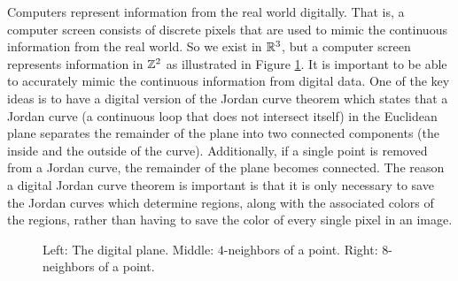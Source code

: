 \begin{comment}
	\item This statement is true. Since $C_1$ and $C_2$ are closed, we know that $C_1 = \overline{C_1}$ and $C_2 = \overline{C_2}$. By Exercise \ref{ex:product_closure} we know that 
	\[C_1 \times C_2 = \overline{C_1} \times \overline{C_2} = \overline{C_1 \times C_2}.\]
	So $C_1 \times C_2$ is closed in $X_1 \times X_2$. 
		
	\item This statement is true. Since $C_1 \times C_2$ is closed, we know that $C_1 \times C_2 = \overline{C_1 \times C_2}$. By Exercise \ref{ex:product_closure} we know that 
	\[C_1 \times C_2 = \overline{C_1 \times C_2} = \overline{C_1} \times \overline{C_2}.\]
	So $C_1 = \overline{C_1}$ and $C_2 = \overline{C_2}$ and $C_1$ and $C_2$ are closed. 
			
	\ea

\end{comment}

\ee



Computers represent information from the real world digitally. That is, a computer screen consists of discrete pixels that are used to mimic the continuous information from the real world. So we exist in $\mathbb{R}^3$, but a computer screen represents information in $\mathbb{Z}^2$ as illustrated in Figure \ref{F:Digital_plane}. It is important to be able to accurately mimic the continuous information from digital data. One of the key ideas is to have a digital version of the Jordan curve theorem which states that a Jordan curve (a continuous loop that does not intersect itself) in the Euclidean plane separates the remainder of the  plane into two connected components (the inside and the outside of the curve). Additionally, if a single point is removed from a Jordan curve, the remainder of the plane becomes connected. The reason a digital Jordan curve theorem is important is that it is only necessary to save the Jordan curves which determine regions, along with the associated colors of the regions, rather than having to save the color of every single pixel in an image. 

\begin{figure}[t]
\begin{center}
 \hspace{0.25in}  \hspace{0.25in} 
\caption{Left: The digital plane. Middle: $4$-neighbors of a point. Right: $8$-neighbors of a point.}
\label{F:Digital_plane}
\end{center}
\end{figure}

